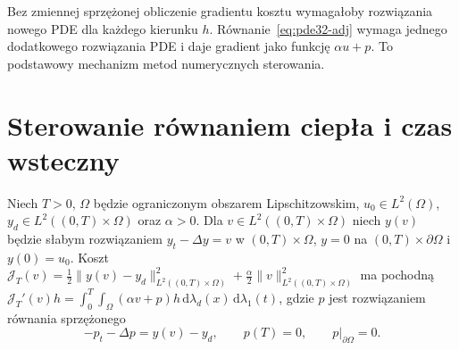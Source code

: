 \begin{uwaga}
Bez zmiennej sprzężonej obliczenie gradientu kosztu
wymagałoby rozwiązania nowego PDE dla każdego kierunku $h$.
Równanie~\eqref{eq:pde32-adj} wymaga jednego dodatkowego
rozwiązania PDE i daje gradient jako funkcję $\alpha u+p$.
To podstawowy mechanizm metod numerycznych sterowania.
\end{uwaga}

\section{Sterowanie równaniem ciepła i czas wsteczny}
\begin{stwierdzenie}
\label{prop:pde32-heat-adjoint}
Niech $T>0$, $\Omega$ będzie ograniczonym obszarem
Lipschitzowskim, $u_0\in L^2(\Omega)$, $y_d\in
L^2((0,T)\times\Omega)$ oraz $\alpha>0$.
Dla $v\in L^2((0,T)\times\Omega)$ niech $y(v)$ będzie
słabym rozwiązaniem
$y_t-\Delta y=v$ w $(0,T)\times\Omega$,
$y=0$ na $(0,T)\times\partial\Omega$ i $y(0)=u_0$.
Koszt
$\mathcal J_T(v)=\frac12\|y(v)-y_d\|_{L^2((0,T)\times\Omega)}^2
+\frac\alpha2\|v\|_{L^2((0,T)\times\Omega)}^2$
ma pochodną
$\mathcal J_T'(v)h=
\int_0^T\!\int_\Omega(\alpha v+p)h
\,\mathrm d\lambda_d(x)\,\mathrm d\lambda_1(t)$,
gdzie $p$ jest rozwiązaniem równania sprzężonego
\[
 -p_t-\Delta p=y(v)-y_d,
 \qquad p(T)=0,\qquad p|_{\partial\Omega}=0.
\]
\end{stwierdzenie}
